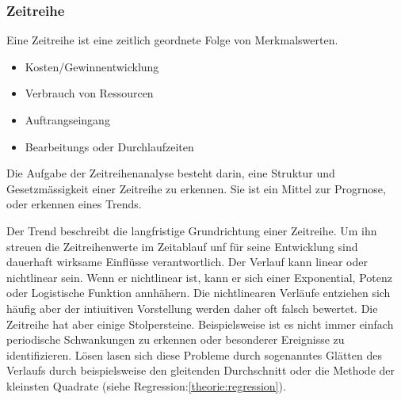 \subsubsection{Zeitreihe}
\begin{tcolorbox}[colback=green!5,colframe=green!40!black, title=Zeitreihe]
Eine Zeitreihe ist eine zeitlich geordnete Folge von Merkmalswerten. 
\begin{itemize}
\item Kosten/Gewinnentwicklung
\item Verbrauch von Ressourcen
\item Auftrangseingang
\item Bearbeitungs oder Durchlaufzeiten
\end{itemize}
Die Aufgabe der Zeitreihenanalyse besteht darin, eine Struktur und Gesetzmässigkeit einer Zeitreihe zu erkennen. Sie ist ein Mittel zur Progrnose, oder erkennen eines Trends.
\end{tcolorbox}
Der Trend beschreibt die langfristige Grundrichtung einer Zeitreihe. Um ihn streuen die Zeitreihenwerte im Zeitablauf unf für seine Entwicklung sind dauerhaft wirksame Einflüsse verantwortlich. Der Verlauf kann linear oder nichtlinear sein. Wenn er nichtlinear ist, kann er sich einer Exponential, Potenz oder Logistische Funktion annhähern. Die nichtlinearen Verläufe entziehen sich häufig aber der intiuitiven Vorstellung werden daher oft falsch bewertet.
Die Zeitreihe hat aber einige Stolpersteine. Beispielsweise ist es nicht immer einfach periodische Schwankungen zu erkennen oder besonderer Ereignisse zu identifizieren. Lösen lasen sich diese Probleme durch sogenanntes Glätten des Verlaufs durch beispielsweise den gleitenden Durchschnitt oder die Methode der kleinsten Quadrate (siehe Regression:\autoref{theorie:regression}).
